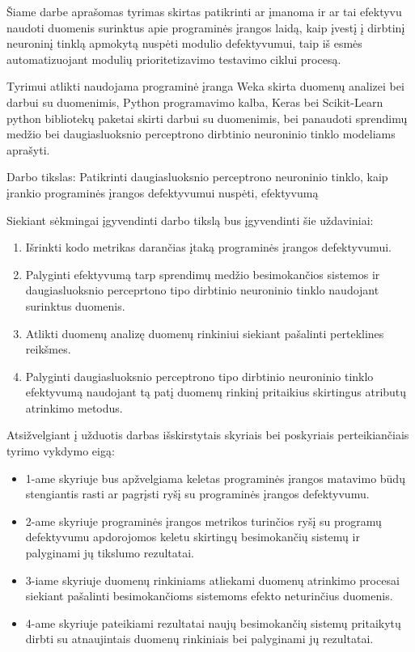 \documentclass{VUMIFPSbakalaurinis}
\begin{document}
Šiame darbe aprašomas tyrimas skirtas patikrinti ar įmanoma ir ar tai efektyvu naudoti duomenis surinktus apie programinės įrangos laidą, kaip įvestį į dirbtinį neuroninį tinklą apmokytą nuspėti modulio defektyvumui, taip iš esmės automatizuojant modulių prioritetizavimo testavimo ciklui procesą.

Tyrimui atlikti naudojama programinė įranga Weka skirta duomenų analizei bei darbui su duomenimis, Python programavimo kalba, Keras bei Scikit-Learn python bibliotekų paketai skirti darbui su duomenimis, bei panaudoti sprendimų medžio bei daugiasluoksnio perceptrono dirbtinio neuroninio tinklo modeliams aprašyti.

Darbo tikslas: Patikrinti daugiasluoksnio perceptrono neuroninio tinklo, kaip įrankio programinės įrangos defektyvumui nuspėti, efektyvumą

Siekiant sėkmingai įgyvendinti darbo tikslą bus įgyvendinti šie uždaviniai:
\begin{enumerate}
\item Išrinkti kodo metrikas darančias įtaką programinės įrangos defektyvumui.
\item Palyginti efektyvumą tarp sprendimų medžio besimokančios sistemos ir daugiasluoksnio perceprtono tipo dirbtinio neuroninio tinklo naudojant surinktus duomenis.
\item Atlikti duomenų analizę duomenų rinkiniui siekiant pašalinti perteklines reikšmes.
\item Palyginti daugiasluoksnio perceptrono tipo dirbtinio neuroninio tinklo efektyvumą naudojant tą patį duomenų rinkinį pritaikius skirtingus atributų atrinkimo metodus.
\end{enumerate}

Atsižvelgiant į užduotis darbas išskirstytais skyriais bei poskyriais perteikiančiais tyrimo vykdymo eigą:
\begin{itemize}
\item[] 1-ame skyriuje bus apžvelgiama keletas programinės įrangos matavimo būdų stengiantis rasti ar pagrįsti ryšį su programinės įrangos defektyvumu.
\item[] 2-ame skyriuje programinės įrangos metrikos turinčios ryšį su programų defektyvumu apdorojomos keletu skirtingų besimokančių sistemų ir palyginami jų tikslumo rezultatai.
\item[] 3-iame skyriuje duomenų rinkiniams atliekami duomenų atrinkimo procesai siekiant pašalinti besimokančioms sistemoms efekto neturinčius duomenis.
\item[] 4-ame skyriuje pateikiami rezultatai naujų besimokančių sistemų pritaikytų dirbti su atnaujintais duomenų rinkiniais bei palyginami jų rezultatai.
\end{itemize}
 
\end{document}
